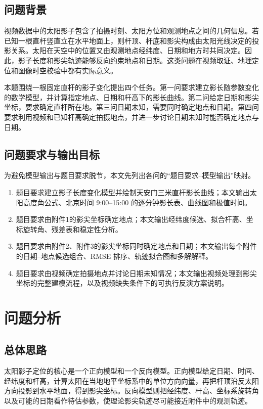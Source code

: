 \documentclass[UTF8,a4paper,12pt]{ctexart}
\begin{document}
\subsection{问题背景}
视频数据中的太阳影子包含了拍摄时刻、太阳方位和观测地点之间的几何信息。若已知一根直杆竖直立在水平地面上，则杆顶、杆底和影尖构成由太阳光线决定的投影关系。太阳在天空中的位置又由观测地点经纬度、日期和地方时共同决定。因此，影子长度和影尖轨迹能够反向约束地点和日期。这类问题在视频取证、地理定位和图像时空校验中都有实际意义。

本题围绕一根固定直杆的影子变化提出四个任务。第一问要求建立影长随参数变化的数学模型，并计算指定地点、日期和杆高下的影长曲线。第二问给定日期和影尖坐标，要求确定直杆所在地。第三问日期未知，需要同时确定地点和日期。第四问要求利用视频和已知杆高确定拍摄地点，并进一步讨论日期未知时能否确定地点与日期。

\subsection{问题要求与输出目标}
为避免模型输出与题目要求脱节，本文先列出各问的“题目要求--模型输出”映射。
\begin{enumerate}[label=\textbf{问题\arabic*：}]
  \item 题目要求建立影子长度变化模型并绘制天安门三米直杆影长曲线；本文输出太阳高度角公式、北京时间 9:00--15:00 的逐分钟影长表、曲线图和极值时间。
  \item 题目要求由附件1的影尖坐标确定地点；本文输出经纬度候选、拟合杆高、坐标旋转角、残差表和稳定性分析。
  \item 题目要求由附件2、附件3的影尖坐标同时确定地点和日期；本文输出每个附件的日期--地点候选组合、RMSE 排序、轨迹拟合图和多解解释。
  \item 题目要求由视频确定拍摄地点并讨论日期未知情况；本文输出视频处理到影尖坐标的完整建模流程，以及视频缺失条件下的可执行反演方案说明。
\end{enumerate}

\section{问题分析}
\subsection{总体思路}
太阳影子定位的核心是一个正向模型和一个反向模型。正向模型给定日期、时间、经纬度和杆高，计算太阳在当地地平坐标系中的单位方向向量，再把杆顶沿反太阳方向投影到水平地面，得到影尖坐标。反向模型则把经纬度、杆高、坐标系旋转角以及可能的日期看作待估参数，使理论影尖轨迹尽可能接近附件中的观测轨迹。
\end{document}
